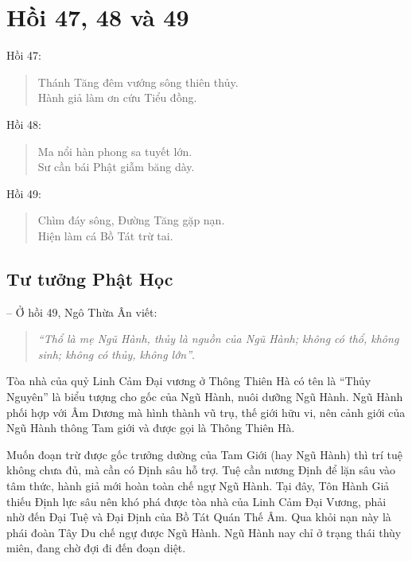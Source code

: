 \chapter{Hồi 47, 48 và 49} %
\label{cha:hoi_47_48}

Hồi 47:

\begin{verse}
\begin{itshape}
Thánh Tăng đêm vướng sông thiên thủy.\\
Hành giả làm ơn cứu Tiểu đồng.
\end{itshape}
\end{verse}

Hồi 48:

\begin{verse}
\begin{itshape}
Ma nổi hàn phong sa tuyết lớn.\\
Sư cần bái Phật giẫm băng dày.
\end{itshape}
\end{verse}

Hồi 49:

\begin{verse}
\begin{itshape}
Chìm đáy sông, Đường Tăng gặp nạn.\\
Hiện làm cá Bồ Tát trừ tai.
\end{itshape}
\end{verse}

\section{Tư tưởng Phật Học} %
\label{sec:47_48_phat_hoc}

-- Ở hồi 49, Ngô Thừa Ân viết:

\begin{quote}
\emph{``Thổ là mẹ Ngũ Hành, thủy là nguồn của Ngũ Hành; không có thổ, không sinh; không có thủy, không lớn''}.
\end{quote}

Tòa nhà của quỷ Linh Cảm Đại vương ở Thông Thiên Hà có tên là ``Thủy Nguyên'' là biểu tượng cho gốc của Ngũ Hành, nuôi dưỡng Ngũ Hành. Ngũ Hành phối hợp với Âm Dương mà hình thành vũ trụ, thế giới hữu vi, nên cảnh giới của Ngũ Hành thông Tam giới và được gọi là Thông Thiên Hà.

Muốn đoạn trừ được gốc trưởng dường của Tam Giới (hay Ngũ Hành) thì trí tuệ không chưa đủ, mà cần có Định sâu hỗ trợ. Tuệ cần nương Định để lặn sâu vào tâm thức, hành giả mới hoàn toàn chế ngự Ngũ Hành. Tại đây, Tôn Hành Giả thiếu Định lực sâu nên khó phá được tòa nhà của Linh Cảm Đại Vương, phải nhờ đến Đại Tuệ và Đại Định của Bồ Tát Quán Thế Âm. Qua khỏi nạn này là phái đoàn Tây Du chế ngự được Ngũ Hành. Ngũ Hành nay chỉ ở trạng thái thùy miên, đang chờ đợi đi đến đoạn diệt.

